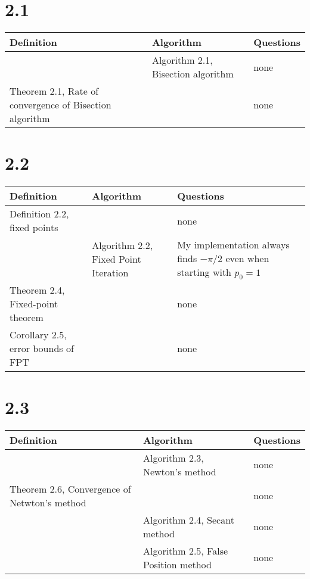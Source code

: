 \documentclass{article}
\begin{document}
\section*{2.1}

\begin{tabularx}{\textwidth}{ |X|X|X| }
    \hline
	{\bf Definition} & {\bf Algorithm} & {\bf Questions} \\
    \hline
	 & Algorithm 2.1, Bisection algorithm & none \\
    \hline
	Theorem 2.1, Rate of convergence of Bisection algorithm & & none \\
    \hline
\end{tabularx}

\section*{2.2}

\begin{tabularx}{\textwidth}{ |X|X|X| }
    \hline
	{\bf Definition} & {\bf Algorithm} & {\bf Questions} \\
    \hline
	Definition 2.2, fixed points & & none \\
    \hline
	 & Algorithm 2.2, Fixed Point Iteration & My implementation always finds $-\pi/2$ even when starting with $p_0=1$ \\
    \hline
	Theorem 2.4, Fixed-point theorem & & none \\
    \hline
	Corollary 2.5, error bounds of FPT & & none \\
    \hline
\end{tabularx}

\section*{2.3}

\begin{tabularx}{\textwidth}{ |X|X|X| }
    \hline
	{\bf Definition} & {\bf Algorithm} & {\bf Questions} \\
    \hline
	 & Algorithm 2.3, Newton's method & none \\
    \hline
	Theorem 2.6, Convergence of Netwton's method & & none \\
    \hline
	 & Algorithm 2.4, Secant method & none \\
    \hline
	 & Algorithm 2.5, False Position method & none \\
    \hline
\end{tabularx}
\end{document}
